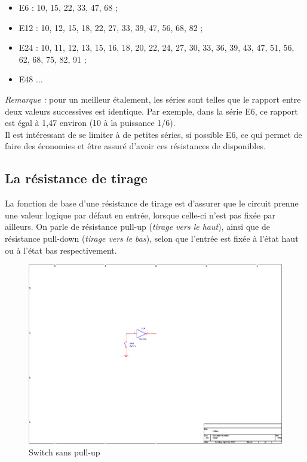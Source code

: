 \documentclass[a4paper]{article}
\begin{document}
\begin{itemize}
	\item E6 : 10, 15, 22, 33, 47, 68 ;
	\item E12 : 10, 12, 15, 18, 22, 27, 33, 39, 47, 56, 68, 82 ;
	\item E24 : 10, 11, 12, 13, 15, 16, 18, 20, 22, 24, 27, 30, 33, 36, 39, 43, 47, 51, 56, 62, 68, 75, 82, 91 ;
	\item E48 ...
\end{itemize}

\textit{Remarque :} pour un meilleur étalement, les séries sont telles que le rapport entre deux valeurs successives est identique. Par exemple, dans la série E6, ce rapport est égal à 1,47 environ (10 à la puissance 1/6).\\
Il est intéressant de se limiter à de petites séries, si possible E6, ce qui permet de faire des économies et être assuré d'avoir ces résistances de disponibles.

\subsection{La résistance de tirage}


La fonction de base d'une résistance de tirage est d'assurer que le circuit prenne une valeur logique par défaut en entrée, lorsque celle-ci n'est pas fixée par ailleurs. On parle de résistance pull-up (\textit{tirage vers le haut}), ainsi que de résistance pull-down (\textit{tirage vers le bas}), selon que l'entrée est fixée à l'état haut ou à l'état bas respectivement.

\begin{figure}[H]
	\centering
	\includegraphics[scale=1.00]{Images/Switch_sans_pull-up}
	\caption{Switch sans pull-up
		\label{Switch_sans_pull-up}}
\end{figure}
\end{document}
